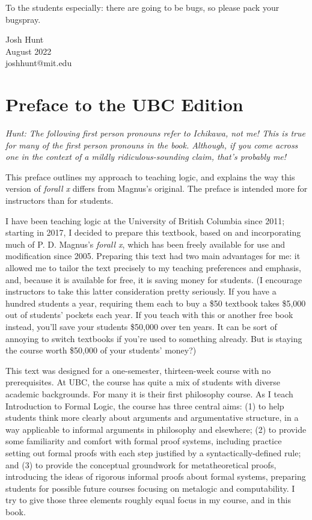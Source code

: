To the students especially: there are going to be bugs, so please pack your bugspray. 

\begin{flushright}
Josh Hunt \\
August 2022 \\
joshhunt@mit.edu
\end{flushright}


\chapter*{Preface to the UBC Edition}
\label{ch.preface}

\textit{Hunt: The following first person pronouns refer to Ichikawa, not me! This is true for many of the first person pronouns in the book. Although, if you come across one in the context of a mildly ridiculous-sounding claim, that's probably me!}

This preface outlines my approach to teaching logic, and explains the way this version of \emph{forall x} differs from Magnus's original. The preface is intended more for instructors than for students. 

I have been teaching logic at the University of British Columbia since 2011; starting in 2017, I decided to prepare this textbook, based on and incorporating much of P. D. Magnus's \emph{forall x}, which has been freely available for use and modification since 2005. Preparing this text had two main advantages for me: it allowed me to tailor the text precisely to my teaching preferences and emphasis, and, because it is available for free, it is saving money for students. (I encourage instructors to take this latter consideration pretty seriously. If you have a hundred students a year, requiring them each to buy a \$50 textbook takes \$5,000 out of students' pockets each year. If you teach with this or another free book instead, you'll save your students \$50,000 over ten years. It can be sort of annoying to switch textbooks if you're used to something already. But is staying the course worth \$50,000 of your students' money?)

This text was designed for a one-semester, thirteen-week course with no prerequisites. At UBC, the course has quite a mix of students with diverse academic backgrounds. For many it is their first philosophy course. As I teach Introduction to Formal Logic, the course has three central aims: (1) to help students think more clearly about arguments and argumentative structure, in a way applicable to informal arguments in philosophy and elsewhere; (2) to provide some familiarity and comfort with formal proof systems, including practice setting out formal proofs with each step justified by a syntactically-defined rule; and (3) to provide the conceptual groundwork for metatheoretical proofs, introducing the ideas of rigorous informal proofs about formal systems, preparing students for possible future courses focusing on metalogic and computability. I try to give those three elements roughly equal focus in my course, and in this book.

